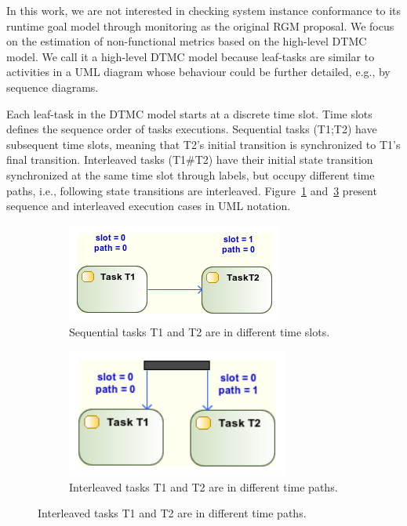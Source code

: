 In this work, we are not interested in checking system instance conformance to its runtime goal model through monitoring as the original RGM proposal. We focus on the estimation of non-functional metrics based on the high-level DTMC model. We call it a high-level DTMC model because leaf-tasks are similar to activities in a UML diagram whose behaviour could be further detailed, e.g., by sequence diagrams.

Each leaf-task in the DTMC model starts at a discrete time slot. Time slots defines the sequence order of tasks executions. Sequential tasks (T1;T2) have subsequent time slots, meaning that T2's initial transition is synchronized to T1's final transition. Interleaved tasks (T1\#T2) have their initial state transition synchronized at the same time slot through labels, but occupy different time paths, i.e., following state transitions are interleaved.  Figure~\ref{fig:UML_SEQ_TSKS} and~\ref{fig:UML_PAR_TSKS} present sequence and interleaved execution cases in UML notation.

\begin{figure}[ht!]
        \centering
        \begin{subfigure}[b]{0.4\textwidth}
                \includegraphics[width=\textwidth]{imgs/UML_SEQ_TSKS.png}
				\caption{Sequential tasks T1 and T2 are in different time slots.}
				\label{fig:UML_SEQ_TSKS}
        \end{subfigure}        
        \quad %
        \begin{subfigure}[b]{0.4\textwidth}                
                \includegraphics[width=0.8\textwidth]{imgs/UML_PAR_TSKS.png}
				\caption{Interleaved tasks T1 and T2 are in different time paths.}
				\label{fig:UML_PAR_TSKS}
        \end{subfigure}%
          
\end{figure}

